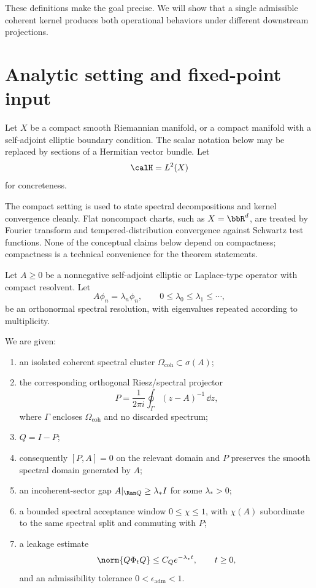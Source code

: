 \documentclass[11pt]{article}
\newcommand{\epsadm}{\epsilon_{\mathrm{adm}}}
\newcommand{\coh}{\mathrm{coh}}
\begin{document}
These definitions make the goal precise. We will show that a single admissible coherent
kernel produces both operational behaviors under different downstream projections.

\section{Analytic setting and fixed-point input}

Let \(X\) be a compact smooth Riemannian manifold, or a compact manifold with a
self-adjoint elliptic boundary condition. The scalar notation below may be replaced by
sections of a Hermitian vector bundle. Let
\[
  \calH=L^2(X)
\]
for concreteness.

\begin{remark}
The compact setting is used to state spectral decompositions and kernel convergence cleanly.
Flat noncompact charts, such as \(X=\bbR^d\), are treated by Fourier transform and
tempered-distribution convergence against Schwartz test functions. None of the conceptual
claims below depend on compactness; compactness is a technical convenience for the theorem
statements.
\end{remark}

Let \(A\ge0\) be a nonnegative self-adjoint elliptic or Laplace-type operator with compact
resolvent. Let
\[
  A\phi_n=\lambda_n\phi_n,
  \qquad
  0\le \lambda_0\le\lambda_1\le\cdots,
\]
be an orthonormal spectral resolution, with eigenvalues repeated according to multiplicity.

\begin{assumption}
We are given:
\begin{enumerate}[label=(\roman*)]
  \item an isolated coherent spectral cluster \(\Omega_{\coh}\subset\sigma(A)\);
  \item the corresponding orthogonal Riesz/spectral projector
  \[
    P=\frac{1}{2\pi i}\oint_{\Gamma}(z-A)^{-1}\,\dd z,
  \]
  where \(\Gamma\) encloses \(\Omega_{\coh}\) and no discarded spectrum;
  \item \(Q=I-P\);
  \item consequently \([P,A]=0\) on the relevant domain and \(P\) preserves the smooth
  spectral domain generated by \(A\);
  \item an incoherent-sector gap \(A|_{\Ran Q}\ge \lambda_\ast I\) for some
  \(\lambda_\ast>0\);
  \item a bounded spectral acceptance window \(0\le\chi\le1\), with \(\chi(A)\) subordinate
  to the same spectral split and commuting with \(P\);
  \item a leakage estimate
  \[
    \norm{Q\Phi_tQ}\le C_Qe^{-\lambda_\ast t},
    \qquad t\ge0,
  \]
  and an admissibility tolerance \(0<\epsadm<1\).
\end{enumerate}
\end{assumption}
\end{document}
